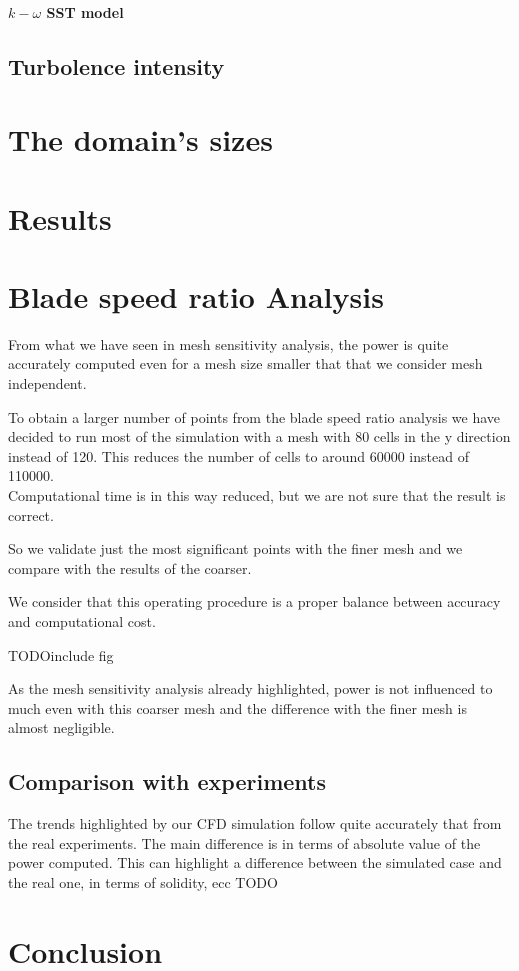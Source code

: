 \documentclass[a4paper,12pt]{article}
\newcommand{\todo}{\colorbox{cyan!60}{TODO}}
\begin{document}
\paragraph{$k-\omega $ SST model}

\subsection{Turbolence intensity}

\section{The domain's sizes}

\section{Results}

\section{Blade speed ratio Analysis}

From what we have seen in mesh sensitivity analysis, the power is quite accurately computed even for a mesh size smaller that that we consider mesh independent.

To obtain a larger number of points from the blade speed ratio analysis we have decided to run most of the simulation with a mesh with 80 cells in the y direction instead of 120. This reduces the number of cells to around 60000 instead of 110000. 
\\Computational time is in this way reduced, but we are not sure that the result is correct.

So we validate just the most significant points with the finer mesh and we compare with the results of the coarser.

We consider that this operating procedure is a proper balance between accuracy and computational cost.

\todo{include fig}

As the mesh sensitivity analysis already highlighted, power is not influenced to much even with this coarser mesh and the difference with the finer mesh is almost negligible.

\subsection{Comparison with experiments}

The trends highlighted by our CFD simulation follow quite accurately that from the real experiments.
The main difference is in terms of absolute value of the power computed. 
This can highlight a difference between the simulated case and the real one, in terms of solidity, ecc \todo 

\section{Conclusion}
\end{document}
